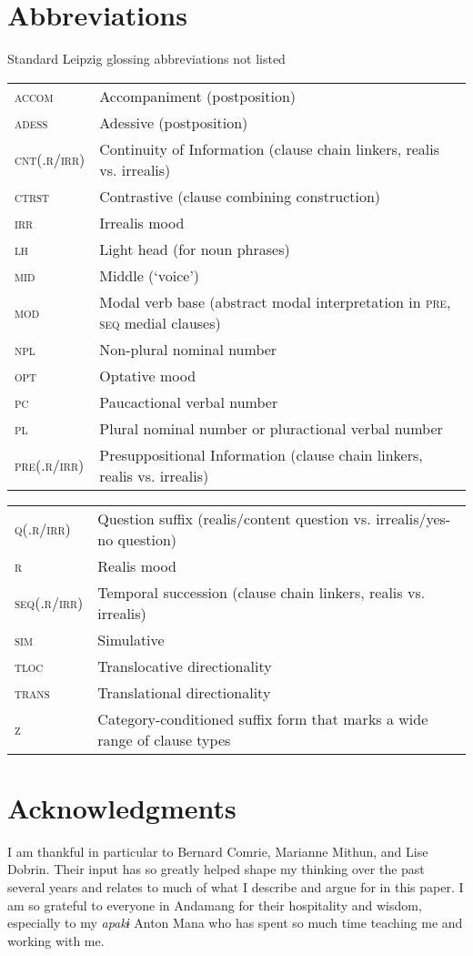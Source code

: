 \documentclass[output=paper]{langscibook}
\begin{document}
\section*{Abbreviations}
Standard Leipzig glossing abbreviations not listed
\noindent

\begin{tabularx}{.45\textwidth}{lQ}
\textsc{accom} &   Accompaniment (postposition)\\
\textsc{adess} &   Adessive (postposition)\\
\textsc{cnt(.r/irr)} &  Continuity of Information (clause chain linkers, realis vs. irrealis)\\
\textsc{ctrst} &   Contrastive (clause combining construction)\\
\textsc{irr} &   Irrealis mood\\
\textsc{lh} &   Light head (for noun phrases)\\
\textsc{mid} & Middle (‘voice’)\\
\textsc{mod} &   Modal verb base (abstract modal interpretation in \textsc{pre}, \textsc{seq} medial clauses)\\
\textsc{npl} &   Non-plural nominal number\\
\textsc{opt} &   Optative mood\\
\textsc{pc} &   Paucactional verbal number\\
\textsc{pl} &   Plural nominal number or pluractional verbal number\\
\textsc{pre(.r/irr)} &  Presuppositional Information (clause chain linkers, realis vs. irrealis)\\
\end{tabularx}
\begin{tabularx}{.45\textwidth}{lQ}
\textsc{q(.r/irr)} &  Question suffix (realis/content question vs. irrealis/yes-no question)\\
\textsc{r} &   Realis mood\\
\textsc{seq(.r/irr)} &  Temporal succession (clause chain linkers, realis vs. irrealis)\\
\textsc{sim} &   Simulative\\
\textsc{tloc} &   Translocative directionality\\
\textsc{trans} &   Translational directionality\\
\textsc{z} &   Category-conditioned suffix form that marks a wide range of clause types\\
\end{tabularx}

\section*{Acknowledgments}

I am thankful in particular to Bernard Comrie, Marianne Mithun, and Lise Dobrin. Their input has so greatly helped shape my thinking over the past several years and relates to much of what I describe and argue for in this paper. I am so grateful to everyone in Andamang for their hospitality and wisdom, especially to my \textit{apakɨ} Anton Mana who has spent so much time teaching me and working with me.


\sloppy\printbibliography[heading=subbibliography,notkeyword=this]
\end{document}
